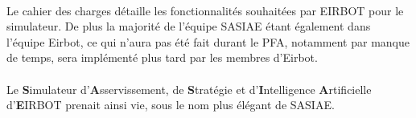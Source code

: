 \paragraph{}
Le cahier des charges détaille les fonctionnalités souhaitées par EIRBOT pour le simulateur. De plus la majorité de l'équipe SASIAE étant également dans l'équipe Eirbot, ce qui n'aura pas été fait durant le PFA, notamment par manque de temps, sera implémenté plus tard par les membres d'Eirbot.

\paragraph{}
Le \textbf{S}imulateur d'\textbf{A}sservissement, de \textbf{S}tratégie et d'\textbf{I}ntelligence \textbf{A}rtificielle d'\textbf{E}IRBOT prenait ainsi vie, sous le nom plus élégant de SASIAE.

